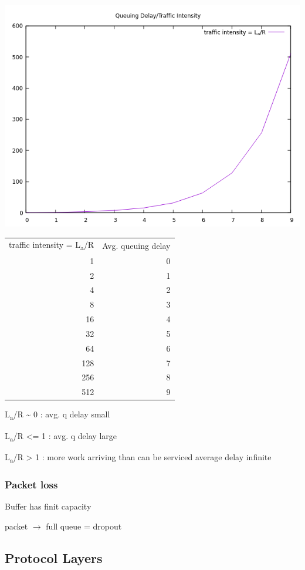 \documentclass[11pt]{article}
\begin{document}
\begin{center}
\includegraphics[width=.9\linewidth]{../img/qDelay.png}
\end{center}

\begin{center}
\begin{tabular}{rr}
traffic intensity = L\textsubscript{a}/R & Avg. queuing delay\\
1 & 0\\
2 & 1\\
4 & 2\\
8 & 3\\
16 & 4\\
32 & 5\\
64 & 6\\
128 & 7\\
256 & 8\\
512 & 9\\
\end{tabular}
\end{center}


L\textsubscript{a}/R \textasciitilde{} 0 : avg. q delay small

L\textsubscript{a}/R <= 1 : avg. q delay large

L\textsubscript{a}/R > 1 : more work arriving than can be serviced average delay
infinite

\subsubsection{Packet loss}
\label{sec:orge590d65}
Buffer has finit capacity 

packet \(\rightarrow\) full queue = dropout


\subsection{Protocol Layers}
\label{sec:org00f50c2}
\end{document}
